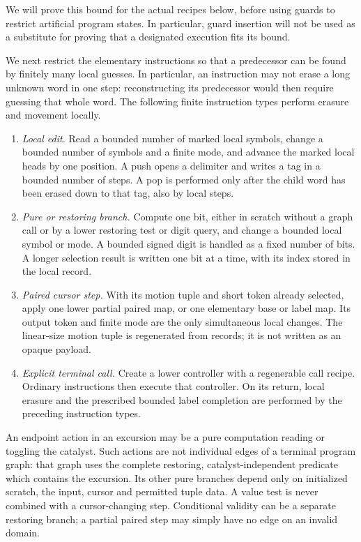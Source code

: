 \documentclass[11pt]{article}
\numberwithin{equation}{section}
\theoremstyle{definition}
\theoremstyle{remark}
\begin{document}
We will prove this bound for the actual recipes below, before using
guards to restrict artificial program states.  In particular, guard
insertion will not be used as a substitute for proving that a designated
execution fits its bound.

We next restrict the elementary instructions so that a predecessor can be found by finitely many local guesses. In particular, an instruction may not erase a long unknown word in one step: reconstructing its predecessor would then require guessing that whole word. The following finite instruction types perform erasure and movement locally.
\begin{enumerate}
\item \emph{Local edit.} Read a bounded number of marked local symbols,
  change a bounded number of symbols and a finite mode, and advance the
  marked local heads by one position.  A push opens a delimiter and
  writes a tag in a bounded number of steps.  A pop is performed only
  after the child word has been erased down to that tag, also by local
  steps.
\item \emph{Pure or restoring branch.} Compute one bit, either in scratch
  without a graph call or by a lower restoring test or digit query, and
  change a bounded local symbol or mode.  A bounded signed digit is
  handled as a fixed number of bits.  A longer selection result is
  written one bit at a time, with its index stored in the local record.
\item \emph{Paired cursor step.} With its motion tuple and short token
  already selected, apply one lower partial paired map, or one elementary
  base or label map.  Its output token and finite mode are the only
  simultaneous local changes.  The linear-size motion tuple is
  regenerated from records; it is not written as an opaque payload.
\item \emph{Explicit terminal call.} Create a lower controller with a
  regenerable call recipe.  Ordinary instructions then execute that
  controller.  On its return, local erasure and the prescribed bounded
  label completion are performed by the preceding instruction types.
\end{enumerate}
An endpoint action in an excursion may be a pure computation reading or
toggling the catalyst.  Such actions are not individual edges of a
terminal program graph: that graph uses the complete restoring,
catalyst-independent predicate which contains the excursion.  Its other
pure branches depend only on initialized scratch, the input, cursor and
permitted tuple data.  A value test is never combined with a cursor-changing
step.  Conditional validity can be a separate restoring branch; a
partial paired step may simply have no edge on an invalid domain.
\end{document}
